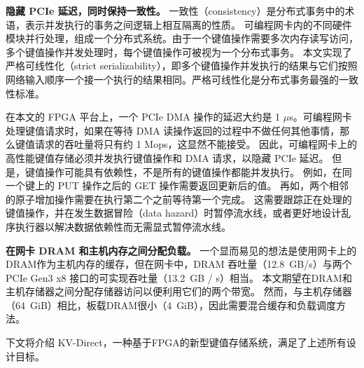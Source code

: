 \textbf {隐藏 PCIe 延迟，同时保持一致性。}
一致性（consistency）是分布式事务中的术语，表示并发执行的事务之间逻辑上相互隔离的性质。
可编程网卡内的不同硬件模块并行处理，组成一个分布式系统。由于一个键值操作需要多次内存读写访问，多个键值操作并发处理时，每个键值操作可被视为一个分布式事务。
本文实现了严格可线性化（strict serializability），即多个键值操作并发执行的结果与它们按照网络输入顺序一个接一个执行的结果相同。严格可线性化是分布式事务最强的一致性标准。

在本文的 FPGA 平台上，一个 PCIe DMA 操作的延迟大约是 1 $\mu$s。可编程网卡处理键值请求时，如果在等待 DMA 读操作返回的过程中不做任何其他事情，那么键值请求的吞吐量将只有约 1 Mops，这显然不能接受。
因此，可编程网卡上的高性能键值存储必须并发执行键值操作和 DMA 请求，以隐藏 PCIe 延迟。
但是，键值操作可能具有依赖性，不是所有的键值操作都能并发执行。
例如，在同一个键上的 PUT 操作之后的 GET 操作需要返回更新后的值。
再如，两个相邻的原子增加操作需要在执行第二个之前等待第一个完成。
这需要跟踪正在处理的键值操作，并在发生数据冒险（data hazard）时暂停流水线，或者更好地设计乱序执行器以解决数据依赖性而无需显式暂停流水线。


\textbf {在网卡 DRAM 和主机内存之间分配负载。}
一个显而易见的想法是使用网卡上的DRAM作为主机内存的缓存，但在网卡中，DRAM 吞吐量（12.8~GB/s）与两个 PCIe Gen3 x8 接口的可实现吞吐量（13.2~GB / s）相当。 
本文期望在DRAM和主机存储器之间分配存储器访问以便利用它们的两个带宽。
然而，与主机存储器（64~GiB）相比，板载DRAM很小（4~GiB），因此需要混合缓存和负载调度方法。

下文将介绍 KV-Direct，一种基于FPGA的新型键值存储系统，满足了上述所有设计目标。
